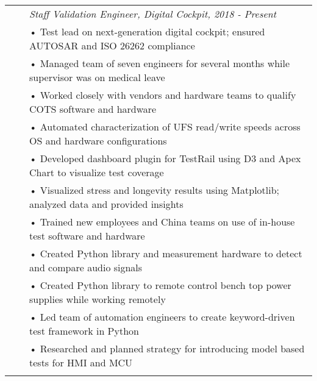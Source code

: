 \documentclass{minimal}
\begin{document}
\begin{tabular}{ p{1.5cm} p{1cm} p{16cm} }
& & \textit{Staff Validation Engineer, Digital Cockpit, 2018 - Present}\\
& & • Test lead on next-generation digital cockpit; ensured AUTOSAR and ISO 26262 compliance\\
& & • Managed team of seven engineers for several months while supervisor was on medical leave\\
& & • Worked closely with vendors and hardware teams to qualify COTS software and hardware\\
& & • Automated characterization of UFS read/write speeds across OS and hardware configurations\\
& & • Developed dashboard plugin for TestRail using D3 and Apex Chart to visualize test coverage\\
& & • Visualized stress and longevity results using Matplotlib; analyzed data and provided insights\\
& & • Trained new employees and China teams on use of in-house test software and hardware\\
& & • Created Python library and measurement hardware to detect and compare audio signals\\
& & • Created Python library to remote control bench top power supplies while working remotely\\
& & • Led team of automation engineers to create keyword-driven test framework in Python\\
& & • Researched and planned strategy for introducing model based tests for HMI and MCU\\
& & \\
\end{tabular}
\end{document}
